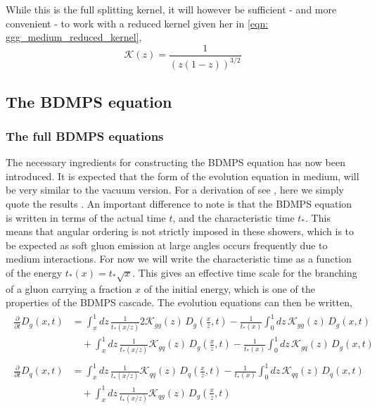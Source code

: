 \documentclass[main.tex]{subfiles}
\begin{document}
While this is the full splitting kernel, it will however be sufficient - and more convenient - to work with a reduced kernel given her in \autoref{eqn: ggg_medium_reduced_kernel}, 
\begin{equation}\label{eqn: ggg_medium_reduced_kernel}
    \mathcal{K}(z) = \frac{1}{\left( z(1-z)\right)^{3/2}}
\end{equation}

\subsection{The BDMPS equation}\label{sec: BDMPS_theory}
\subsubsection*{The full BDMPS equations}
The necessary ingredients for constructing the BDMPS equation has now been introduced. It is expected that the form of the evolution equation in medium, will be very similar to the vacuum version. For a derivation of see \cite{Probabilistic_picture}, here we simply quote the results \cite{Energy_flow_medium_cascade_2016}. An important difference to note is that the BDMPS equation is written in terms of the actual time \(t\), and the characteristic time \(t_*\). This means that angular ordering is not strictly imposed in these showers, which is to be expected as soft gluon emission at large angles occurs frequently due to medium interactions. For now we will write the characteristic time as a function of the energy \(t_*(x) = t_* \sqrt{x}\). This gives an effective time scale for the branching of a gluon carrying a fraction \(x\) of the initial energy, which is one of the properties of the BDMPS cascade. The evolution equations can then be written,
\begin{align}\label{eqn: BDMPS_gluons}
\begin{split}
    \frac{\partial}{\partial t} D_g(x,t) &= \int_x^1 dz\, \frac{1}{t_*(x/z)} 2\mathcal{K}_{gg}(z)\, D_g\left(\frac{x}{z}, t\right) - \frac{1}{t_*(x)} \int_0^1 dz\, \mathcal{K}_{gg}(z)\, D_g \left(x,t\right) \\
    &\quad + \int_x^1 dz\, \frac{1}{t_*(x/z)} \mathcal{K}_{gq}(z)\, D_g\left(\frac{x}{z}, t\right) - \frac{1}{t_*(x)} \int_0^1 dz\, \mathcal{K}_{gq}(z)\, D_g \left(x,t\right)
\end{split}
\end{align}
\begin{align}\label{eqn: BDMPS_quarks}
\begin{split}
    \frac{\partial}{\partial t} D_q(x,t) &= \int_x^1 dz\, \frac{1}{t_*(x/z)} \mathcal{K}_{qq}(z)\, D_q\left(\frac{x}{z}, t\right) -\frac{1}{t_*(x)} \int_0^1 dz\, \mathcal{K}_{qq}(z)\, D_q \left(x,t\right) \\
    &\quad + \int_x^1 dz\, \frac{1}{t_*(x/z)} \mathcal{K}_{qg}(z)\, D_g\left(\frac{x}{z}, t\right) 
\end{split}
\end{align}
\end{document}
